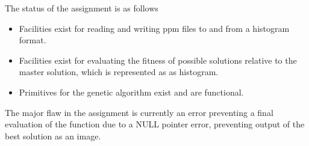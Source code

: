 \documentclass{article}
\begin{document}

The status of the assignment is as follows

\begin{itemize}
        \item Facilities exist for reading and writing ppm files to and from a histogram format.
        \item Facilities exist for evaluating the fitness of possible solutions relative to the master solution, which is represented as as histogram.
        \item Primitives for the genetic algorithm exist and are functional.
\end{itemize}

The major flaw in the assignment is currently an error preventing a final evaluation of the function due to a NULL pointer error, preventing output of the best solution as an image.
\end{document}
